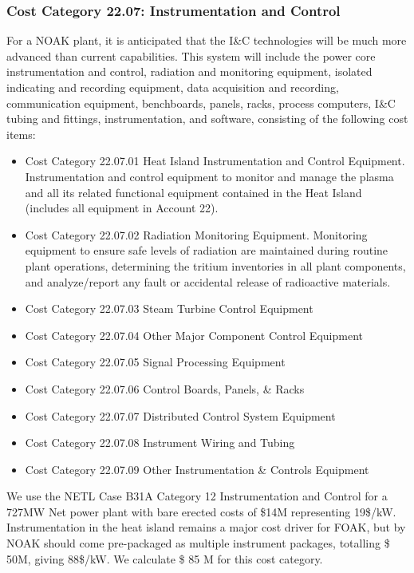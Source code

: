 \subsubsection{Cost Category 22.07: Instrumentation and Control }

For a NOAK plant, it is anticipated that the I\&C technologies will be much more advanced than current  capabilities. This system will include the power core instrumentation and control, radiation and  monitoring equipment, isolated indicating and recording equipment, data acquisition and  recording, communication equipment, benchboards, panels, racks, process computers, I\&C tubing and fittings, instrumentation, and software, consisting of the following cost items:

\begin{itemize}
\item Cost Category 22.07.01 Heat Island Instrumentation and Control Equipment. Instrumentation and control equipment to monitor and manage the plasma and all  its related functional equipment contained in the Heat Island (includes all equipment in Account 22).

\item Cost Category 22.07.02 Radiation Monitoring Equipment. Monitoring equipment to ensure safe levels of radiation are maintained  during routine plant operations, determining the tritium inventories in all plant components, and  analyze/report any fault or accidental release of radioactive materials. 

\item Cost Category 22.07.03 Steam Turbine Control Equipment	

\item Cost Category 22.07.04 Other Major Component Control Equipment	

\item Cost Category 22.07.05 Signal Processing Equipment	

\item Cost Category 22.07.06 Control Boards, Panels, \& Racks	
\item Cost Category 22.07.07 Distributed Control System Equipment	
\item Cost Category 22.07.08 Instrument Wiring and Tubing	
\item Cost Category 22.07.09 Other Instrumentation \& Controls Equipment	


\end{itemize}


We use the NETL Case B31A Category 12 Instrumentation and Control for a 727MW Net power plant with bare erected costs of \$14M representing 19\$/kW.  Instrumentation in the heat island remains a major cost driver for FOAK, but by NOAK should come pre-packaged as multiple instrument packages, totalling \$ 50M, giving 88\$/kW.   We calculate \$ 85 M for this cost category.